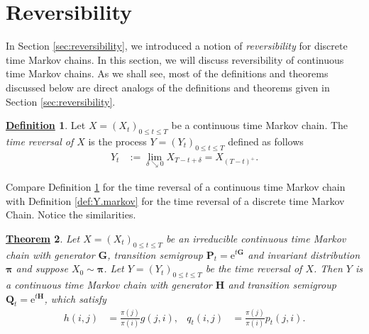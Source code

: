 \documentclass[12pt]{book}
\numberwithin{equation}{chapter}
\theoremstyle{plain}
\newtheorem{theorem}{\underline{Theorem}}
\numberwithin{theorem}{section}
\theoremstyle{definition}
\newtheorem{definition}[theorem]{\underline{Definition}}
\numberwithin{exercise}{chapter}
\newcommand{\<}{\langle}
\renewcommand{\>}{\rangle}
\renewcommand{\(}{\left(}
\renewcommand{\)}{\right)}
\renewcommand{\[}{\left[}
\renewcommand{\]}{\right]}
\newcommand\del{\delta}
\newcommand\Gv{\pmb{G}}
\newcommand\Pv{\pmb{P}}
\newcommand\Qv{\pmb{Q}}
\newcommand\Hv{\pmb{H}}
\newcommand\piv{\pmb{\pi}}
\newcommand\ee{\mathrm{e}}
\begin{document}
\section{Reversibility}
\label{sec:ctmc_RV}

In Section \ref{sec:reversibility}, we introduced a notion of \textit{reversibility} for discrete time Markov chains.  In this section, we will discuss reversibility of continuous time Markov chains.  As we shall see, most of the definitions and theorems discussed below are direct analogs of the definitions and theorems given in Section \ref{sec:reversibility}.

\begin{definition}
\label{def:reversal.cont}
Let $X = (X_t)_{0 \leq t \leq T}$ be a continuous time Markov chain.  The \textit{time reversal of $X$} is the process $Y = (Y_t)_{0 \leq t \leq T}$ defined as follows
\begin{align}
Y_t
	&:=	\lim_{\del \searrow 0} X_{T-t+\del} = X_{(T-t)^+}.
\end{align}
\end{definition}

\noindent
Compare Definition \ref{def:reversal.cont} for the time reversal of a continuous time Markov chain with Definition \ref{def:Y.markov} for the time reversal of a discrete time Markov Chain.  Notice the similarities.

\begin{theorem}
\label{thm:generator.reversal}
Let $X = (X_t)_{0 \leq t \leq T}$ be an irreducible continuous time Markov chain with 
generator $\Gv$, transition semigroup $\Pv_t = \ee^{t \Gv}$ and invariant distribution $\piv$ and suppose $X_0 \sim \piv$.  
Let $Y = (Y_t)_{0 \leq t \leq T}$ be the time reversal of $X$.  
Then $Y$ is a continuous time Markov chain with generator $\Hv$ and transition semigroup $\Qv_t = \ee^{t \Hv}$, which satisfy
\begin{align}
h(i,j)
	&=	\frac{\pi(j)}{\pi(i)}g(j,i) ,  &
q_t(i,j)
	&=	\frac{\pi(j)}{\pi(i)}p_t(j,i) . \label{eq:h.g}
\end{align}
\end{theorem}
\end{document}
